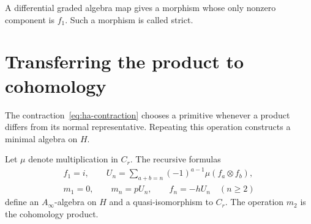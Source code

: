 A differential graded algebra map gives a morphism whose only
nonzero component is $f_1$. Such a morphism is called strict.

\section{Transferring the product to cohomology}
\label{sec:ha-transfer}

The contraction~\eqref{eq:ha-contraction} chooses a primitive whenever
a product differs from its normal representative. Repeating this
operation constructs a minimal algebra on $H$.

\begin{proposition}\label{prop:ha-transfer}
Let $\mu$ denote multiplication in $C_r$. The recursive formulas
\begin{equation}\label{eq:ha-transfer-recursion}
 \begin{gathered}
 f_1=i,\qquad
 U_n=\sum_{a+b=n}(-1)^{a-1}\mu(f_a\otimes f_b),\\
 m_1=0,\qquad m_n=pU_n,\qquad f_n=-hU_n\quad(n\geq2)
 \end{gathered}
\end{equation}
define an $A_\infty$-algebra on $H$ and a quasi-isomorphism to $C_r$.
The operation $m_2$ is the cohomology product.
\end{proposition}

